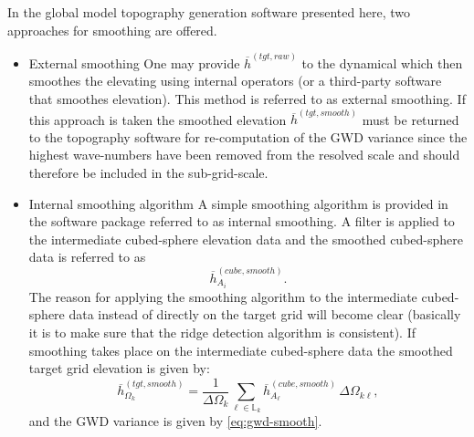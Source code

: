 \documentclass[gmd]{copernicus}
\begin{document}
In the global model topography generation software presented here, two approaches for smoothing are offered. 
\begin{itemize}
\item{External smoothing} 
One may provide $\overline{h}^{(tgt,raw)}$ to the dynamical which then smoothes the elevating using internal operators (or a third-party software that smoothes elevation). This method is referred to as external smoothing. If this approach is taken the smoothed elevation  $\overline{h}^{(tgt,smooth)}$ must be returned to the topography software for re-computation of the GWD variance since the highest wave-numbers have been removed from the resolved scale and should therefore be included in the sub-grid-scale.
\item{Internal smoothing algorithm}
{\color{red}{Julio: please fill in the details; maybe the glory details could be in an Appendix as Section 2 is already quite long ...}}
A simple smoothing algorithm is provided in the software package referred to as internal smoothing. A filter is applied to the intermediate cubed-sphere elevation data and the smoothed cubed-sphere data is referred to as
\begin{equation}
\overline{h}^{(cube,smooth)}_{A_i}.
\end{equation}
The reason for applying the smoothing algorithm to the intermediate cubed-sphere data instead of directly on the target grid will become clear (basically it is to make sure that the ridge detection algorithm is consistent). If smoothing takes place on the intermediate cubed-sphere data the smoothed target grid elevation is given by:
\begin{equation}
\overline{h}^{(tgt,smooth)}_{\Omega_k}=\frac{1}{\Delta \Omega_k}\sum_{\ell\in {\mathbb{L}}_k}\overline{h}_{A_\ell}^{(cube,smooth)}\, \Delta \Omega_{k\ell},
\end{equation}
and the GWD variance is given by \eqref{eq:gwd-smooth}.
\end{itemize}
%
\end{document}
